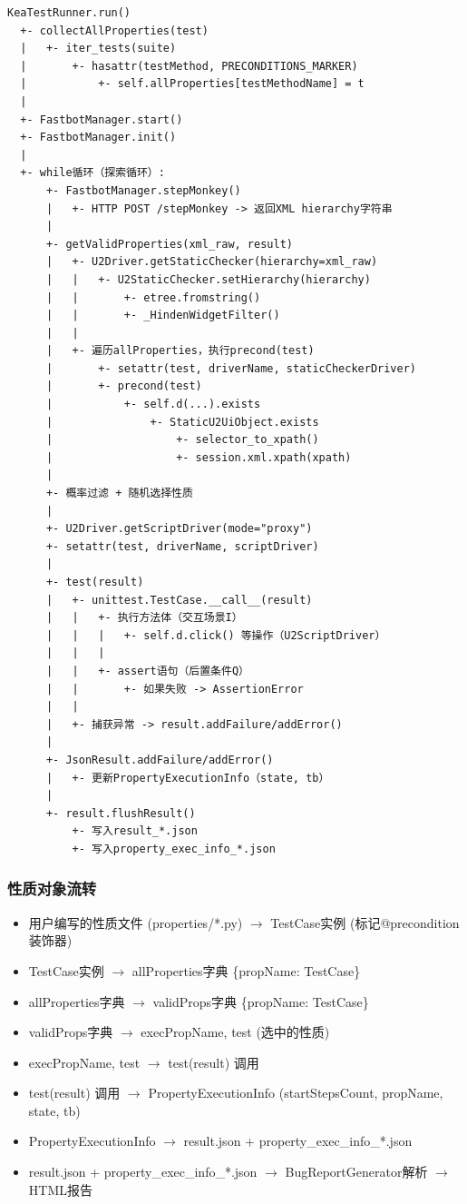 \documentclass[a4paper, zihao=-4]{ctexart}
\begin{document}
\begin{lstlisting}
KeaTestRunner.run()
  +- collectAllProperties(test)
  |   +- iter_tests(suite)
  |       +- hasattr(testMethod, PRECONDITIONS_MARKER)
  |           +- self.allProperties[testMethodName] = t
  |
  +- FastbotManager.start()
  +- FastbotManager.init()
  |
  +- while循环（探索循环）:
      +- FastbotManager.stepMonkey()
      |   +- HTTP POST /stepMonkey -> 返回XML hierarchy字符串
      |
      +- getValidProperties(xml_raw, result)
      |   +- U2Driver.getStaticChecker(hierarchy=xml_raw)
      |   |   +- U2StaticChecker.setHierarchy(hierarchy)
      |   |       +- etree.fromstring()
      |   |       +- _HindenWidgetFilter()
      |   |
      |   +- 遍历allProperties，执行precond(test)
      |       +- setattr(test, driverName, staticCheckerDriver)
      |       +- precond(test)
      |           +- self.d(...).exists
      |               +- StaticU2UiObject.exists
      |                   +- selector_to_xpath()
      |                   +- session.xml.xpath(xpath)
      |
      +- 概率过滤 + 随机选择性质
      |
      +- U2Driver.getScriptDriver(mode="proxy")
      +- setattr(test, driverName, scriptDriver)
      |
      +- test(result)
      |   +- unittest.TestCase.__call__(result)
      |   |   +- 执行方法体（交互场景I）
      |   |   |   +- self.d.click() 等操作（U2ScriptDriver）
      |   |   |
      |   |   +- assert语句（后置条件Q）
      |   |       +- 如果失败 -> AssertionError
      |   |
      |   +- 捕获异常 -> result.addFailure/addError()
      |
      +- JsonResult.addFailure/addError()
      |   +- 更新PropertyExecutionInfo（state, tb）
      |
      +- result.flushResult()
          +- 写入result_*.json
          +- 写入property_exec_info_*.json
\end{lstlisting}

\subsubsection{性质对象流转}
\begin{itemize}
    \item 用户编写的性质文件 (properties/*.py) $\rightarrow$ TestCase实例 (标记@precondition装饰器)
    \item TestCase实例 $\rightarrow$ allProperties字典 \{propName: TestCase\}
    \item allProperties字典 $\rightarrow$ validProps字典 \{propName: TestCase\}
    \item validProps字典 $\rightarrow$ execPropName, test (选中的性质)
    \item execPropName, test $\rightarrow$ test(result) 调用
    \item test(result) 调用 $\rightarrow$ PropertyExecutionInfo (startStepsCount, propName, state, tb)
    \item PropertyExecutionInfo $\rightarrow$ result.json + property\_exec\_info\_*.json
    \item result.json + property\_exec\_info\_*.json $\rightarrow$ BugReportGenerator解析 $\rightarrow$ HTML报告
\end{itemize}
\end{document}

